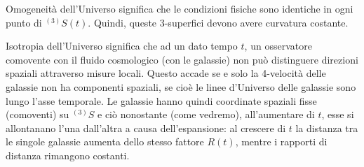 Omogeneità dell'Universo significa che le condizioni fisiche sono identiche in
ogni punto di $^{(3)}S(t)$.  Quindi, queste 3-superfici devono avere curvatura
costante.

Isotropia dell'Universo significa che ad un dato tempo $t$, un osservatore
comovente con il fluido cosmologico (con le galassie) non può distinguere
direzioni spaziali attraverso misure locali.  Questo accade se e solo la
4-velocità delle galassie non ha componenti spaziali, se cioè le linee
d'Universo delle galassie sono lungo l'asse temporale.  Le galassie hanno quindi
coordinate spaziali fisse (comoventi) su $^{(3)}S$ e ciò nonostante (come
vedremo), all'aumentare di $t$, esse si allontanano l'una dall'altra a causa
dell'espansione: al crescere di $t$ la distanza tra le singole
galassie aumenta dello stesso fattore $R(t)$, mentre i rapporti di distanza
rimangono costanti.

